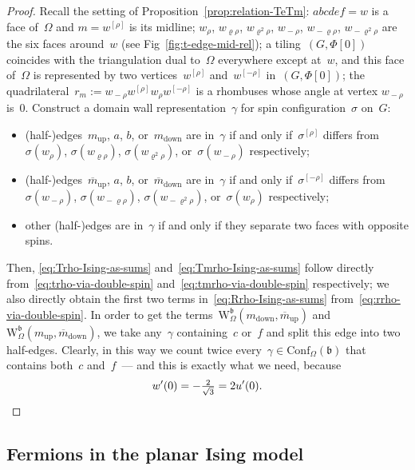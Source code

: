 \documentclass[reqno,11pt,a4paper]{amsart}
\theoremstyle{remark}
\renewcommand{\b}{\mathfrak{b}}
\newcommand{\weOne}{w_{\rho}}
\newcommand{\weTwo}{w_{\varrho\rho}}
\newcommand{\weThree}{w_{\varrho^2\rho}}
\newcommand{\weFour}{w_{\!-\rho}}
\newcommand{\weFive}{w_{\!-\varrho\rho}}
\newcommand{\weSix}{w_{\!-\varrho^2\rho}}
\newcommand{\wrho}{w^{\left[\rho \right]}}
\newcommand{\wmrho}{w^{\left[-\rho \right]}}
\newcommand{\conf}{\mathrm{Conf}}
\newcommand\ConfO[1]{\conf_\Omega(#1)}
\def\Weight{\mathrm{W}}
\begin{document}
\begin{proof}
	Recall the setting of Proposition~\ref{prop:relation-TeTm}: $abcdef=w$ is a face of~$\Omega$ and $m=\wrho$ is its midline; $\weOne$, $\weTwo$, $\weThree$, $\weFour$, $\weFive$, $\weSix$ are the six faces around~$w$ (see Fig~\ref{fig:t-edge-mid-rel}); 
	a tiling~$(G,\Phi[0])$ coincides with the triangulation dual to~$\Omega$ everywhere except at~$w$, and this face of~$\Omega$ is represented by two vertices~$\wrho$ and~$\wmrho$ in~$(G,\Phi[0])$; the quadrilateral~$r_m:=\weFour \wrho  \weOne \wmrho$ is a rhombuses whose angle at vertex $\weFour$ is~$0$.
	Construct a domain wall representation~$\gamma$ for spin configuration~$\sigma$ on~$G$:
	\begin{itemize}
		\item (half-)edges~$m_{\mathrm{up}}$, $a$, $b$, or~$m_{\mathrm{down}}$ are in~$\gamma$ if and only if~$\sigma^{[\rho]}$ differs from~$\sigma(\weOne)$, $\sigma(\weTwo)$, $\sigma(\weThree)$, or~$\sigma(\weFour)$ respectively;
		\item (half-)edges~$\overline{m}_{\mathrm{up}}$, $a$, $b$, or~$\overline{m}_{\mathrm{down}}$ are in~$\gamma$ if and only if~$\sigma^{[-\rho]}$ differs from~$\sigma(\weFour)$, $\sigma(\weFive)$, $\sigma(\weSix)$, or~$\sigma(\weOne)$ respectively;
		\item other (half-)edges are in~$\gamma$ if and only if they separate two faces with opposite spins.
	\end{itemize}
	Then, \eqref{eq:Trho-Ising-as-sums} and~\eqref{eq:Tmrho-Ising-as-sums} follow directly from~\eqref{eq:trho-via-double-spin} and~\eqref{eq:tmrho-via-double-spin} respectively; we also directly obtain the first two terms in~\eqref{eq:Rrho-Ising-as-sums} from~\eqref{eq:rrho-via-double-spin}.
	In order to get the terms~$\Weight^\b_\Omega(m_{\mathrm{down}},\overline{m}_{\mathrm{up}})$ and~$\Weight^\b_\Omega(m_{\mathrm{up}},\overline{m}_\mathrm{down})$, we take any~$\gamma$ containing~$c$ or~$f$ and split this edge into two half-edges.
	Clearly, in this way we count twice every~$\gamma\in\ConfO{\b}$ that contains both~$c$ and~$f$~--- and this is exactly what we need, because
	\[
		w'(0) = -\tfrac2{\sqrt{3}} = 2 u'(0).\qedhere
	\]
\end{proof}


\subsection{Fermions in the planar Ising model}
\label{sub:fermion}
\end{document}
